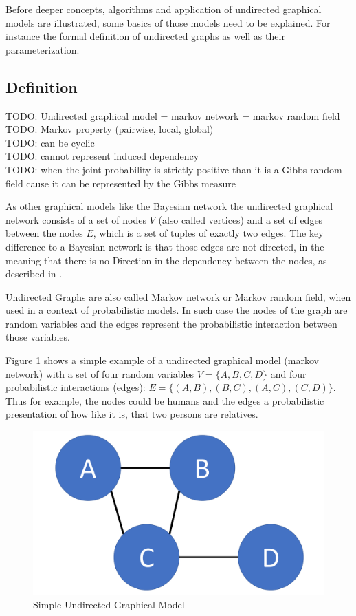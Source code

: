Before deeper concepts, algorithms and application of undirected graphical models are illustrated, some basics of those models need to be explained. For instance the formal definition of undirected graphs as well as their parameterization.

\subsection{Definition}

TODO: Undirected graphical model = markov network = markov random field \cite{kindermann1980markov} \\
TODO: Markov property (pairwise, local, global) \\
TODO: can be cyclic \\
TODO: cannot represent induced dependency \\
TODO: when the joint probability is strictly positive than it is a Gibbs random field cause it can be represented by the Gibbs measure

As other graphical models like the Bayesian network the undirected graphical network consists of a set of nodes $V$ (also called vertices) and a set of edges between the nodes $E$, which is a set of tuples of exactly two edges. The key difference to a Bayesian network is that those edges are not directed, in the meaning that there is no Direction in the dependency between the nodes, as described in \cite{koller2009probabilistic}.

Undirected Graphs are also called Markov network or Markov random field, when used in a context of probabilistic models. In such case the nodes of the graph are random variables and the edges represent the probabilistic interaction between those variables.

Figure \ref{fig:basic} shows a simple example of a undirected graphical model (markov network) with a set of four random variables $V=\{A,B,C,D\}$ and four probabilistic interactions (edges): $E=\{(A,B),(B,C),(A,C),(C,D)\}$. Thus for example, the nodes could be humans and the edges a probabilistic presentation of how like it is, that two persons are relatives.

\begin{figure}[htpb]
  \centering
  	\includegraphics[scale=0.3]{img/basic.pdf} 
  \caption{Simple Undirected Graphical Model}
  \label{fig:basic}
\end{figure}

